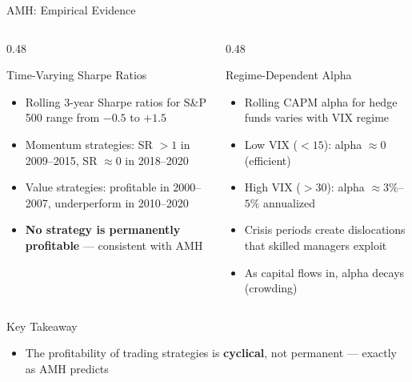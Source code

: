 \documentclass[9pt, aspectratio=169, t]{beamer}
\theoremstyle{definition}
\newenvironment{cminipage}[1]{%
    \par\noindent\hfill\begin{minipage}{#1}\ignorespaces
}{%
    \end{minipage}\hfill\null\par
}
\begin{document}
\begin{frame}{AMH: Empirical Evidence}
\begin{cminipage}{0.95\textwidth}
\small
\begin{columns}[T]
\begin{column}{0.48\textwidth}
\begin{block}{Time-Varying Sharpe Ratios}
\begin{itemize}\setlength{\itemsep}{0pt}
    \item Rolling 3-year Sharpe ratios for S\&P 500 range from $-0.5$ to $+1.5$
    \item Momentum strategies: SR $> 1$ in 2009--2015, SR $\approx 0$ in 2018--2020
    \item Value strategies: profitable in 2000--2007, underperform in 2010--2020
    \item \textbf{No strategy is permanently profitable} --- consistent with AMH
\end{itemize}
\end{block}
\end{column}
\begin{column}{0.48\textwidth}
\begin{block}{Regime-Dependent Alpha}
\begin{itemize}\setlength{\itemsep}{0pt}
    \item Rolling CAPM alpha for hedge funds varies with VIX regime
    \item Low VIX ($<15$): alpha $\approx 0$ (efficient)
    \item High VIX ($>30$): alpha $\approx 3\%$--$5\%$ annualized
    \item Crisis periods create dislocations that skilled managers exploit
    \item As capital flows in, alpha decays (crowding)
\end{itemize}
\end{block}
\end{column}
\end{columns}

\vspace{0.1cm}
\begin{exampleblock}{Key Takeaway}
\begin{itemize}\setlength{\itemsep}{0pt}
    \item The profitability of trading strategies is \textbf{cyclical}, not permanent --- exactly as AMH predicts
\end{itemize}
\end{exampleblock}
\end{cminipage}
\end{frame}
\end{document}
